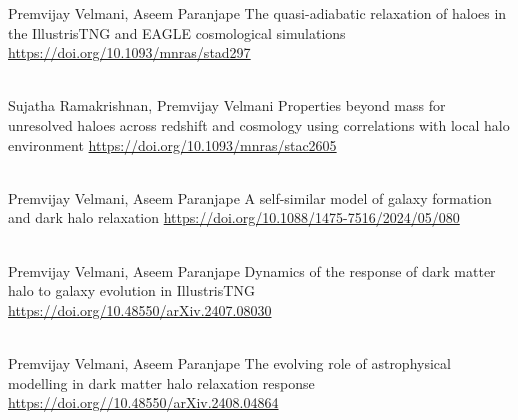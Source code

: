
\begin{cventries}

{
\cventry
{Premvijay Velmani, Aseem Paranjape}
{The quasi-adiabatic relaxation of haloes in the IllustrisTNG and EAGLE cosmological simulations}
{\url{https://doi.org/10.1093/mnras/stad297}}
{}
{
}
}

~\\[-8mm]
{
\cventry
{Sujatha Ramakrishnan, Premvijay Velmani}
{Properties beyond mass for unresolved haloes across redshift and cosmology using correlations with local halo environment}
{\url{https://doi.org/10.1093/mnras/stac2605}}
{}
{
}
}

~\\[-8mm]
{
\cventry
{Premvijay Velmani, Aseem Paranjape}
{A self-similar model of galaxy formation and dark halo relaxation}
{\url{https://doi.org/10.1088/1475-7516/2024/05/080}}
{}
{
}
}

~\\[-8mm]
{
\cventry
{Premvijay Velmani, Aseem Paranjape}
{Dynamics of the response of dark matter halo to galaxy evolution in IllustrisTNG}
{\url{https://doi.org/10.48550/arXiv.2407.08030}}
{}
{
}
}

~\\[-8mm]
{
\cventry
{Premvijay Velmani, Aseem Paranjape}
{The evolving role of astrophysical modelling in dark matter halo relaxation response}
{\url{https://doi.org//10.48550/arXiv.2408.04864}}
{}
{
}
}

\end{cventries}


\newpage
{}

